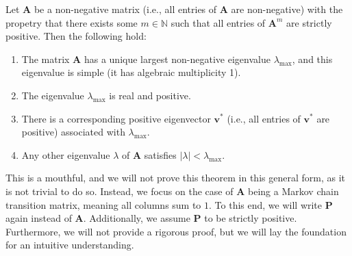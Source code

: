\documentclass[../../main.tex]{subfiles}
\begin{document}
\begin{theorem}
    \label{theorem:perron_frobenius}
    Let \( \bm{A} \) be a non-negative matrix (i.e., all entries of \( \bm{A} \) are non-negative) with the propetry that there exists some \( m \in \mathbb{N} \) such that all entries of \( \bm{A}^m \) are strictly positive. Then the following hold:

    \begin{enumerate}
        \item The matrix \( \bm{A} \) has a unique largest non-negative eigenvalue \( \lambda_{\max} \), and this eigenvalue is simple (it has algebraic multiplicity 1).
        \item The eigenvalue \( \lambda_{\max} \) is real and positive.
        \item There is a corresponding positive eigenvector \( \bm{v}^* \) (i.e., all entries of \( \bm{v}^* \) are positive) associated with \( \lambda_{\max} \).
        \item Any other eigenvalue \( \lambda \) of \( \bm{A} \) satisfies \( |\lambda| < \lambda_{\max} \).
    \end{enumerate}
\end{theorem}

This is a mouthful, and we will not prove this theorem in this general form, as it is not trivial to do so. Instead, we focus on the case of $\bm{A}$ being a Markov chain transition matrix, meaning all columns sum to $1$. To this end, we will write $\bm{P}$ again instead of $\bm{A}$. Additionally, we assume $\bm{P}$ to be strictly positive. Furthermore, we will not provide a rigorous proof, but we will lay the foundation for an intuitive understanding.
\end{document}
